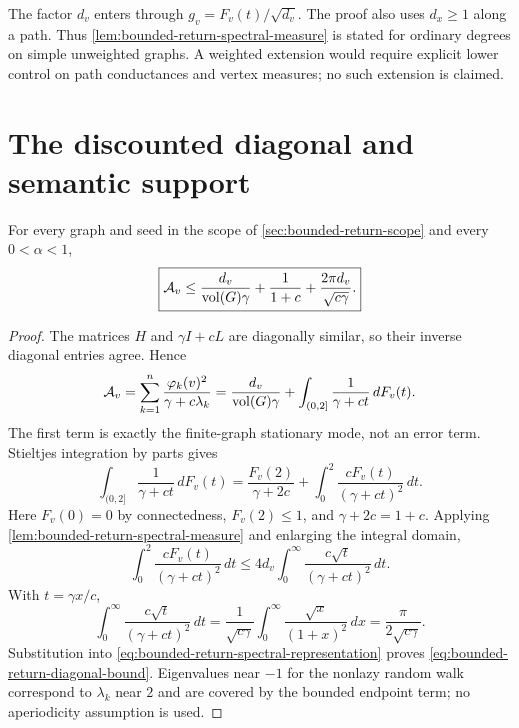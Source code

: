 \documentclass[11pt]{article}
\begin{document}
\begin{remark}
\label{rem:bounded-return-absolute-degree}
The factor $d_v$ enters through
$g_v=F_v(t)/\sqrt{d_v}$.  The proof also uses $d_x\ge1$ along a path.  Thus
\cref{lem:bounded-return-spectral-measure} is stated for ordinary degrees on
simple unweighted graphs.  A weighted extension would require explicit lower
control on path conductances and vertex measures; no such extension is
claimed.
\end{remark}

\section{The discounted diagonal and semantic support}
\label{sec:bounded-return-diagonal}

\begin{theorem}
\label{thm:bounded-return-diagonal}
For every graph and seed in the scope of \cref{sec:bounded-return-scope} and
every $0<\alpha<1$,
\begin{equation}
 \boxed{
 \mathcal A_v
 \le
 \frac{d_v}{\operatorname{vol}(G)\gamma}
 +\frac{1}{1+c}
 +\frac{2\pi d_v}{\sqrt{c\gamma}}.}
 \label{eq:bounded-return-diagonal-bound}
\end{equation}
\end{theorem}

\begin{proof}
The matrices $H$ and $\gamma I+cL$ are diagonally similar, so their
inverse diagonal entries agree.  Hence
\begin{equation}
 \mathcal A_v
 =\sum_{k=1}^n\frac{\varphi_k(v)^2}{\gamma+c\lambda_k}
 =\frac{d_v}{\operatorname{vol}(G)\gamma}
  +\int_{(0,2]}\frac{1}{\gamma+ct}\,dF_v(t).
 \label{eq:bounded-return-spectral-representation}
\end{equation}
The first term is exactly the finite-graph stationary mode, not an error term.
Stieltjes integration by parts gives
\begin{equation}
 \int_{(0,2]}\frac{1}{\gamma+ct}\,dF_v(t)
 =\frac{F_v(2)}{\gamma+2c}
  +\int_0^2\frac{cF_v(t)}{(\gamma+ct)^2}\,dt.
 \label{eq:bounded-return-stieltjes}
\end{equation}
Here $F_v(0)=0$ by connectedness, $F_v(2)\le1$, and
$\gamma+2c=1+c$.  Applying
\cref{lem:bounded-return-spectral-measure} and enlarging the integral domain,
\[
 \int_0^2\frac{cF_v(t)}{(\gamma+ct)^2}\,dt
 \le4d_v\int_0^\infty\frac{c\sqrt t}{(\gamma+ct)^2}\,dt.
\]
With $t=\gamma x/c$,
\begin{equation}
 \int_0^\infty\frac{c\sqrt t}{(\gamma+ct)^2}\,dt
 =\frac{1}{\sqrt{c\gamma}}
   \int_0^\infty\frac{\sqrt x}{(1+x)^2}\,dx
 =\frac{\pi}{2\sqrt{c\gamma}}.
 \label{eq:bounded-return-beta-integral}
\end{equation}
Substitution into \eqref{eq:bounded-return-spectral-representation} proves
\eqref{eq:bounded-return-diagonal-bound}.  Eigenvalues near $-1$ for the
nonlazy random walk correspond to $\lambda_k$ near $2$ and are covered by
the bounded endpoint term; no aperiodicity assumption is used.
\end{proof}
\end{document}
